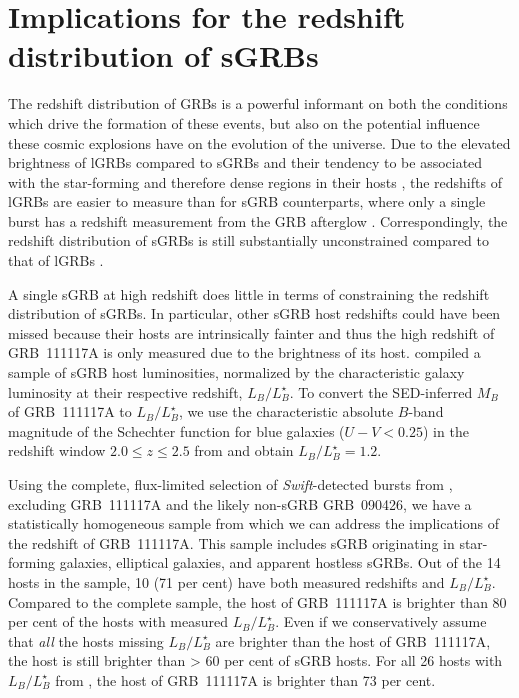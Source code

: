 \documentclass{aa}    %
\begin{document}
\section{Implications for the redshift distribution of sGRBs}


The redshift distribution of GRBs is a powerful informant on both the conditions
which drive the formation of these events, but also on the potential influence
these cosmic explosions have on the evolution of the universe. Due to the
elevated brightness of lGRBs compared to sGRBs \citep{Berger2014} and their
tendency to be associated with the star-forming and therefore dense regions in
their hosts \citep{Fruchter2006, Lyman2017}, the redshifts of lGRBs are easier
to measure than for sGRB counterparts, where only a single burst has a redshift
measurement from the GRB afterglow \citep{Cucchiara2013, DeUgartePostigo2014b}.
Correspondingly, the redshift distribution of sGRBs is still substantially
unconstrained compared to that of lGRBs \citep[e.g., see][]{Jakobsson2012a,
	DAvanzo2015, Perley2016d}.

A single sGRB at high redshift does little in terms of constraining the redshift
distribution of sGRBs. In particular, other sGRB host redshifts could have been
missed because their hosts are intrinsically fainter and thus the high redshift
of GRB~111117A is only measured due to the brightness of its host.
\citet{Berger2014} compiled a sample of sGRB host luminosities, normalized by
the characteristic galaxy luminosity at their respective redshift,
$L_B/L^{\star}_{B}$. To convert the SED-inferred $M_B$ of GRB~111117A to
$L_B/L^{\star}_{B}$, we use the characteristic absolute $B$-band magnitude of
the Schechter function for blue galaxies ($U - V < 0.25$) in the redshift window
$2.0 \leq z \leq 2.5$ from \citet{Marchesini2007} and obtain $L_B/L^{\star}_{B}
= 1.2$.

Using the complete, flux-limited selection of \textit{Swift}-detected bursts
from \citet{DAvanzo2014a}, excluding GRB~111117A and the likely non-sGRB
GRB~090426, we have a statistically homogeneous sample from which we can address
the implications of the redshift of GRB~111117A. This sample includes sGRB
originating in star-forming galaxies, elliptical galaxies, and apparent hostless
sGRBs. Out of the 14 hosts in the sample, 10 (71 per cent) have both measured
redshifts and $L_B/L^{\star}_{B}$. Compared to the complete sample, the host of
GRB~111117A  is brighter than 80 per cent of the hosts with measured
$L_B/L^{\star}_{B}$. Even if we conservatively assume that \textit{all} the
hosts missing $L_B/L^{\star}_{B}$ are brighter than the host of GRB~111117A, the
host is still brighter than > 60 per cent of sGRB hosts. For all 26 hosts with
$L_B/L^{\star}_{B}$ from \citet{Berger2014}, the host of GRB~111117A is brighter
than 73 per cent.
\end{document}

